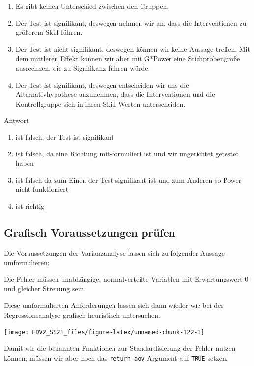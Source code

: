 \documentclass[
]{book}
\begin{document}
\begin{enumerate}
\def\labelenumi{\arabic{enumi}.}
\item
  Es gibt keinen Unterschied zwischen den Gruppen.
\item
  Der Test ist signifikant, deswegen nehmen wir an, dass die Interventionen zu größerem Skill führen.
\item
  Der Test ist nicht signifikant, deswegen können wir keine Aussage treffen. Mit dem mittleren Effekt können wir aber mit G*Power eine Stichprobengröße ausrechnen, die zu Signifikanz führen würde.
\item
  Der Test ist signifikant, deswegen entscheiden wir uns die Alternativhypothese anzunehmen, dass die Interventionen und die Kontrollgruppe sich in ihren Skill-Werten unterscheiden.
\end{enumerate}

Antwort

\begin{enumerate}
\def\labelenumi{\arabic{enumi}.}
\item
  ist falsch, der Test ist signifikant
\item
  ist falsch, da eine Richtung mit-formuliert ist und wir ungerichtet getestet haben
\item
  ist falsch da zum Einen der Test signifikant ist und zum Anderen so Power nicht funktioniert
\item
  ist richtig
\end{enumerate}

\hypertarget{grafisch-voraussetzungen-pruxfcfen}{%
\subsection{Grafisch Voraussetzungen prüfen}\label{grafisch-voraussetzungen-pruxfcfen}}

Die Voraussetzungen der Varianzanalyse lassen sich zu folgender Aussage umformulieren:

Die Fehler müssen unabhängige, normalverteilte Variablen mit Erwartungswert 0 und gleicher Streuung sein.

Diese umformulierten Anforderungen lassen sich dann wieder wie bei der Regressionsanalyse grafisch-heuristisch untersuchen.

\begin{center}\texttt{[image: EDV2\_SS21\_files/figure-latex/unnamed-chunk-122-1]} \end{center}

Damit wir die bekannten Funktionen zur Standardisierung der Fehler nutzen können, müssen wir aber noch das \texttt{return\_aov}-Argument auf \texttt{TRUE} setzen.
\end{document}
